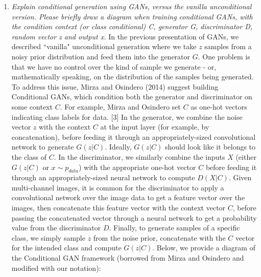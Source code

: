 \documentclass[a4paper]{article}
\begin{document}
\begin{enumerate}
{}
\item{\textit{Explain conditional generation using GANs, versus the vanilla unconditional version. Please briefly draw a diagram when training conditional GANs, with the condition context (or class conditional) C, generator G, discriminator D, random vector z and output x.}
\newline
\newline
In the previous presentation of GANs, we described ``vanilla" unconditional generation where we take $z$ samples from a noisy prior distribution and feed them into the generator $G$. One problem is that we have no control over the kind of sample we generate - or, mathematically speaking, on the distribution of the samples being generated. 
\newline
\newline
To address this issue, Mirza and Osindero (2014) suggest building Conditional GANs, which condition both the generator and discriminator on some context $C$. For example, Mirza and Osindero set $C$ as one-hot vectors indicating class labels for data. [3]
\newline
\newline
In the generator, we combine the noise vector $z$ with the context $C$ at the input layer (for example, by concatenation), before feeding it through an appropriately-sized convolutional network to generate $G(z|C)$. Ideally, $G(z|C)$ should look like it belongs to the class of $C$. In the discriminator, we similarly combine the inputs $X$ (either $G(z|C)$ or $x \sim p_{data}$) with the appropriate one-hot vector $C$ before feeding it through an appropriately-sized neural network to compute $D(X|C)$. Given multi-channel images, it is common for the discriminator to apply a convolutional network over the image data to get a feature vector over the images, then concatenate this feature vector with the context vector $C$, before passing the concatenated vector through a neural network to get a probability value from the discriminator $D$. Finally, to generate samples of a specific class, we simply sample $z$ from the noise prior, concatenate with the $C$ vector for the intended class and compute $G(z|C)$. 
\newline
\newline
Below, we provide a diagram of the Conditional GAN framework (borrowed from Mirza and Osindero and modified with our notation):
\begin{figure}[H]

\end{figure}}
\end{enumerate}
\end{document}

